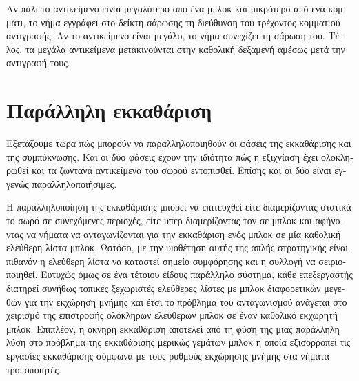 \begin{greek}
Αν πάλι το αντικείμενο είναι μεγαλύτερο από ένα μπλοκ και μικρότερο
από ένα κομμάτι, το νήμα εγγράφει στο δείκτη σάρωσης τη διεύθυνση του
τρέχοντος κομματιού αντιγραφής. Αν το αντικείμενο είναι μεγάλο, το νήμα
συνεχίζει τη σάρωση του. Τέλος, τα μεγάλα αντικείμενα μετακινούνται
στην καθολική δεξαμενή αμέσως μετά την αντιγραφή τους. 

\section{Παράλληλη εκκαθάριση}
Εξετάζουμε τώρα πώς μπορούν να παραλληλοποιηθούν οι φάσεις
της εκκαθάρισης και της συμπύκνωσης. Και οι δύο φάσεις έχουν την
ιδιότητα πώς η εξιχνίαση έχει ολοκληρωθεί και τα ζωντανά αντικείμενα
του σωρού εντοπισθεί. Επίσης και οι δύο είναι εγγενώς παραλληλοποιήσιμες.

Η παραλληλοποίηση της εκκαθάρισης μπορεί να επιτευχθεί είτε διαμερίζοντας
στατικά το σωρό σε συνεχόμενες περιοχές, είτε υπερ-διαμερίζοντας
τον σε μπλοκ και αφήνοντας να νήματα να ανταγωνίζονται για την
εκκαθάριση ενός μπλοκ σε μία καθολική ελεύθερη λίστα μπλοκ. Ωστόσο,
με την υιοθέτηση αυτής της απλής στρατηγικής είναι πιθανόν η ελεύθερη
λίστα να καταστεί σημείο συμφόρησης και η συλλογή να σειριοποιηθεί.
Ευτυχώς όμως σε ένα τέτοιου είδους παράλληλο σύστημα, κάθε επεξεργαστής
διατηρεί συνήθως τοπικές ξεχωριστές ελεύθερες λίστες με μπλοκ
διαφορετικών μεγεθών για την εκχώρηση μνήμης και έτσι το πρόβλημα
του ανταγωνισμού ανάγεται στο χειρισμό της επιστροφής ολόκληρων
ελεύθερων μπλοκ σε έναν καθολικό εκχωρητή μπλοκ. Επιπλέον, η
οκνηρή εκκαθάριση αποτελεί από τη φύση της μιας παράλληλη λύση
στο πρόβλημα της εκκαθάρισης μερικώς γεμάτων μπλοκ η οποία εξισορροπεί
τις εργασίες εκκαθάρισης σύμφωνα με τους ρυθμούς εκχώρησης μνήμης
στα νήματα τροποποιητές.


\end{greek}
